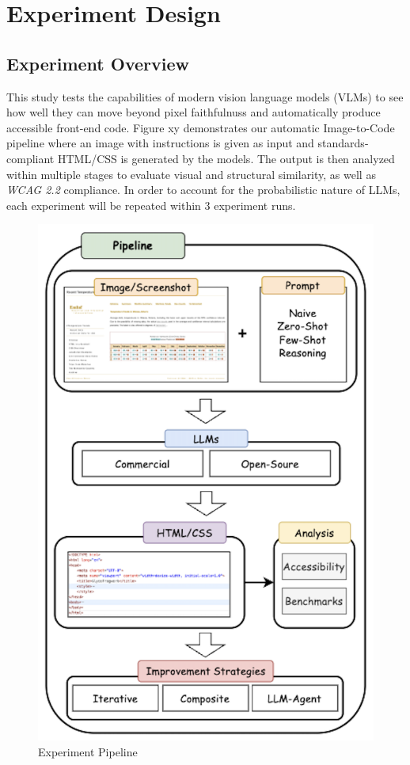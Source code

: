 \chapter{Experiment Design}\label{chapter:Experiment}

\section{Experiment Overview}
This study tests the capabilities of modern vision language models (VLMs) 
to see how well they can move beyond pixel faithfulnuss and automatically
produce accessible front-end code. 
Figure xy demonstrates our automatic Image-to-Code pipeline where an 
image with instructions is given as input and standards-compliant HTML/CSS 
is generated by the models.
The output is then analyzed within multiple stages to evaluate visual 
and structural similarity, as well as \textit{WCAG 2.2} compliance.\newline
In order to account for the probabilistic nature of LLMs, each experiment 
will be repeated within 3 experiment runs.

\begin{figure}[p]
  \centering
  \includegraphics[width=\textwidth]{figures/pipeline2.png}
  \caption{Experiment Pipeline}
  \label{fig:pipeline}
\end{figure}


